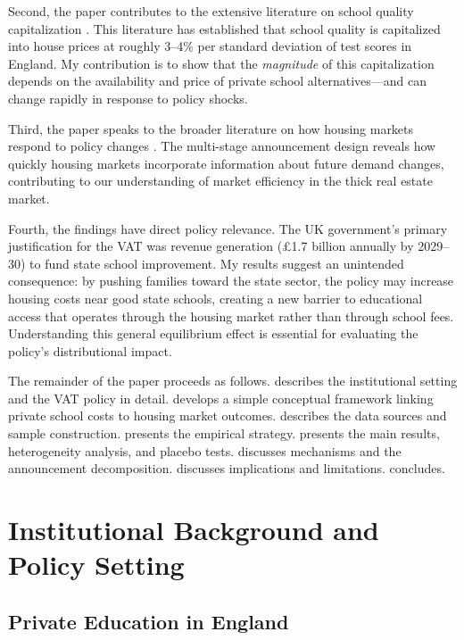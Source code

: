 \documentclass[12pt]{article}
\begin{document}
Second, the paper contributes to the extensive literature on school quality capitalization \citep{black1999, gibbons2003, gibbons2006, gibbons2013, figlio2004, machin2011, hussain2016}. This literature has established that school quality is capitalized into house prices at roughly 3--4\% per standard deviation of test scores in England. My contribution is to show that the \textit{magnitude} of this capitalization depends on the availability and price of private school alternatives---and can change rapidly in response to policy shocks.

Third, the paper speaks to the broader literature on how housing markets respond to policy changes \citep{mian2009, glaeser2014}. The multi-stage announcement design reveals how quickly housing markets incorporate information about future demand changes, contributing to our understanding of market efficiency in the thick real estate market.

Fourth, the findings have direct policy relevance. The UK government's primary justification for the VAT was revenue generation (\pounds 1.7 billion annually by 2029--30) to fund state school improvement. My results suggest an unintended consequence: by pushing families toward the state sector, the policy may increase housing costs near good state schools, creating a new barrier to educational access that operates through the housing market rather than through school fees. Understanding this general equilibrium effect is essential for evaluating the policy's distributional impact.

The remainder of the paper proceeds as follows.  describes the institutional setting and the VAT policy in detail.  develops a simple conceptual framework linking private school costs to housing market outcomes.  describes the data sources and sample construction.  presents the empirical strategy.  presents the main results, heterogeneity analysis, and placebo tests.  discusses mechanisms and the announcement decomposition.  discusses implications and limitations.  concludes.


\section{Institutional Background and Policy Setting}\label{sec:background}

\subsection{Private Education in England}
\end{document}
